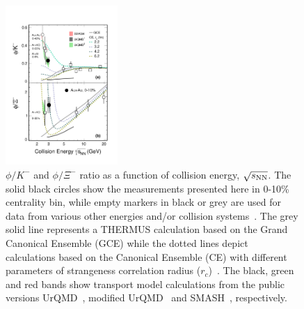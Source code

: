 \documentclass[%
 reprint,	
showpacs,
 amsmath,amssymb,
 aps,
 prc,
]{revtex4-1}
\begin{document}
\begin{figure}
\centering
\hspace*{-4mm}
\includegraphics[width=0.38\textwidth]{fig/fig4_phi_over_kminus_zoomin.eps}
  \caption{ $\phi/K^-$ and $\phi/\Xi^-$ ratio as a function of collision energy, $\sqrt{s_{\rm NN}}$. The solid black circles show the measurements presented here in 0-10\% centrality bin, while empty markers in black or grey are used for data from various other energies and/or collision systems~\cite{E917_phi,NA49_phi,FOPI_phi_AlAl,FOPI_phi_NiNi,HADES_phi_ArKCl,HADES_phi_AuAu,Xi_ArKCl_HADES,star_bes_strangeness}. The grey solid line represents a THERMUS calculation based on the Grand Canonical Ensemble (GCE) while the dotted lines depict calculations based on the Canonical Ensemble (CE) with different parameters of strangeness correlation radius ($r_c$)~\cite{THERMUS_WHEATON200984,Andronic_2018Naure}. The black, green and red bands show transport model calculations from the public versions UrQMD~\cite{urQMD,UrQMD_2}, modified UrQMD~\cite{Steinheimer_2015_UrQMD} and SMASH~\cite{Elfner_SMASH}, respectively.}
\label{fig:phi2Kratio} 
\end{figure}
\end{document}

